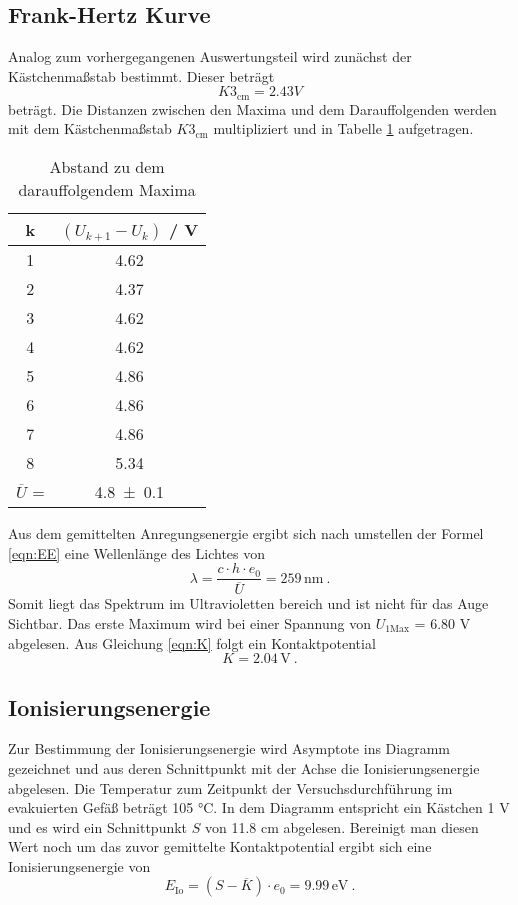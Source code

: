 \subsection{Frank-Hertz Kurve}
Analog zum vorhergegangenen Auswertungsteil wird zunächst der Kästchenmaßstab bestimmt. Dieser beträgt
\begin{equation}
  K3_\text{cm} = 2.43 V
  \label{eqn:K3}
\end{equation}
beträgt. Die Distanzen zwischen den Maxima und dem Darauffolgenden werden mit dem Kästchenmaßstab $K3_\text{cm}$ multipliziert und in Tabelle \ref{tab:Max} aufgetragen.
\begin{table}
  \centering
  \begin{tabular}{c c}
    \toprule
    	k & $(U_{k+1} - U_k)$ / V \\
    \midrule
    	1 & 4.62	\\
    	2 & 4.37	\\
    	3 & 4.62	\\
    	4 & 4.62	\\
    	5 & 4.86	\\
    	6 & 4.86	\\
    	7 & 4.86	\\
    	8 & 5.34	\\
    \midrule
    $\overline{U}$  = & \num{4.8 +- 0.1} \\
    \bottomrule
  \end{tabular}
  \caption{Abstand zu dem darauffolgendem Maxima}
  \label{tab:Max}
\end{table}
Aus dem gemittelten Anregungsenergie ergibt sich nach umstellen der Formel \ref{eqn:EE} eine Wellenlänge des Lichtes von
\begin{equation}
  \lambda = \frac{c \cdot h \cdot e_0}{\overline{U}} = 259 \, \text{nm} \ .
  \label{eqn:spek}
\end{equation}
Somit liegt das Spektrum im Ultravioletten bereich und ist nicht für das Auge Sichtbar. Das erste Maximum wird bei einer Spannung von $U_{1 \text{Max}}$ = 6.80 V abgelesen. Aus Gleichung \ref{eqn:K} folgt ein Kontaktpotential
\begin{equation}
  K = 2.04 \, \text{V} \ .
  \label{eqn:KonFr}
\end{equation}
\subsection{Ionisierungsenergie}
Zur Bestimmung der Ionisierungsenergie wird Asymptote ins Diagramm gezeichnet und aus deren Schnittpunkt mit der Achse die Ionisierungsenergie abgelesen. Die Temperatur zum Zeitpunkt der Versuchsdurchführung im evakuierten Gefäß beträgt 105 °C. In dem Diagramm entspricht ein Kästchen 1 V und es wird ein Schnittpunkt $S$ von 11.8 cm abgelesen. Bereinigt man diesen Wert noch um das zuvor gemittelte Kontaktpotential ergibt sich eine Ionisierungsenergie von
\begin{equation}
  E_\text{Io} = (S - \overline{K}) \cdot e_0 = 9.99 \, \text{eV} \ .
  \label{eqn:EIo}
\end{equation}
